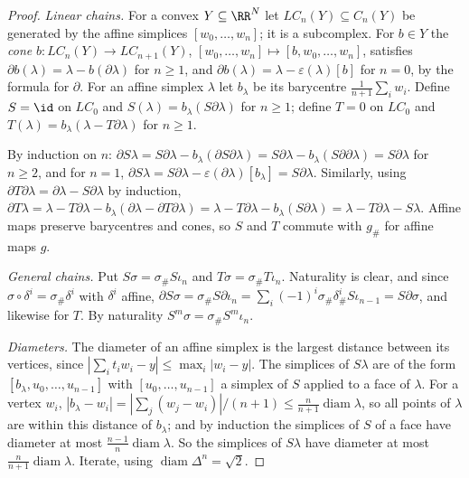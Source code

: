\begin{proof}
\emph{Linear chains.} For a convex $Y \subseteq \RR^N$ let $LC_n(Y) \subseteq C_n(Y)$ be generated by the affine simplices $[w_0, \ldots, w_n]$; it is a subcomplex. For
$b \in Y$ the \emph{cone} $b \colon LC_n(Y) \to LC_{n+1}(Y)$, $[w_0, \ldots, w_n] \mapsto [b, w_0, \ldots, w_n]$, satisfies $\partial b(\lambda) = \lambda - b(\partial\lambda)$
for $n \geq 1$, and $\partial b(\lambda) = \lambda - \varepsilon(\lambda)[b]$ for $n = 0$, by the formula for $\partial$. For an affine simplex $\lambda$ let $b_\lambda$ be
its barycentre $\frac{1}{n+1}\sum_i w_i$. Define $S = \id$ on $LC_0$ and $S(\lambda) = b_\lambda(S\partial\lambda)$ for $n \geq 1$; define $T = 0$ on $LC_0$ and
$T(\lambda) = b_\lambda(\lambda - T\partial\lambda)$ for $n \geq 1$.

By induction on $n$: $\partial S\lambda = S\partial\lambda - b_\lambda(\partial S\partial\lambda) = S\partial\lambda - b_\lambda(S\partial\partial\lambda) = S\partial\lambda$ for $n \geq 2$,
and for $n = 1$, $\partial S\lambda = S\partial\lambda - \varepsilon(\partial\lambda)[b_\lambda] = S\partial\lambda$. Similarly, using $\partial T\partial\lambda = \partial\lambda - S\partial\lambda$ by
induction, $\partial T\lambda = \lambda - T\partial\lambda - b_\lambda(\partial\lambda - \partial T\partial\lambda) = \lambda - T\partial\lambda - b_\lambda(S\partial\lambda) = \lambda - T\partial\lambda - S\lambda$.
Affine maps preserve barycentres and cones, so $S$ and $T$ commute with $g_\#$ for affine maps $g$.

\emph{General chains.} Put $S\sigma = \sigma_\#S\iota_n$ and $T\sigma = \sigma_\#T\iota_n$. Naturality is clear, and since $\sigma \circ \delta^i = \sigma_\#\delta^i$ with $\delta^i$ affine,
$\partial S\sigma = \sigma_\#S\partial\iota_n = \sum_i(-1)^i\sigma_\#\delta^i_\#S\iota_{n-1} = S\partial\sigma$, and likewise for $T$. By naturality
$S^m\sigma = \sigma_\#S^m\iota_n$.

\emph{Diameters.} The diameter of an affine simplex is the largest distance between its vertices, since $|\sum_i t_iw_i - y| \leq \max_i|w_i - y|$. The simplices of
$S\lambda$ are of the form $[b_\lambda, u_0, \ldots, u_{n-1}]$ with $[u_0, \ldots, u_{n-1}]$ a simplex of $S$ applied to a face of $\lambda$. For a vertex $w_i$,
$|b_\lambda - w_i| = |\sum_j (w_j - w_i)|/(n+1) \leq \frac{n}{n+1}\operatorname{diam}\lambda$, so all points of $\lambda$ are within this distance of $b_\lambda$;
and by induction the simplices of $S$ of a face have diameter at most $\frac{n-1}{n}\operatorname{diam}\lambda$. So the simplices of $S\lambda$ have diameter at most
$\frac{n}{n+1}\operatorname{diam}\lambda$. Iterate, using $\operatorname{diam}\Delta^n = \sqrt{2}$.
\end{proof}


